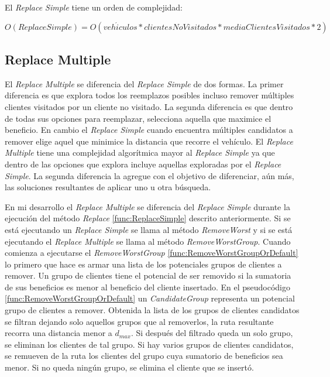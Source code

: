 \begin{minipage}{\linewidth}
El \textit{Replace Simple} tiene un orden de complejidad:

\begin{equation*}
O(Replace Simple) = O(veh\acute{i}culos * clientesNoVisitados * mediaClientesVisitados * 2)
\end{equation*}
\end{minipage}

\bigskip

\subsection{Replace Multiple}

El \textit{Replace Multiple} se diferencia del \textit{Replace Simple} de dos formas. La primer diferencia es que explora todos los reemplazos posibles incluso remover múltiples clientes visitados por un cliente no visitado. La segunda diferencia es que dentro de todas sus opciones para reemplazar, selecciona aquella que maximice el beneficio. En cambio el \textit{Replace Simple} cuando encuentra múltiples candidatos a remover elige aquel que minimice la distancia que recorre el vehículo. El \textit{Replace Multiple} tiene una complejidad algorítmica mayor al \textit{Replace Simple} ya que dentro de las opciones que explora incluye aquellas exploradas por el \textit{Replace Simple}. La segunda diferencia la agregue con el objetivo de diferenciar, aún más, las soluciones resultantes de aplicar uno u otra búsqueda.

\bigskip

En mi desarrollo el \textit{Replace Multiple} se diferencia del \textit{Replace Simple} durante la ejecución del método \textit{Replace} \ref{func:ReplaceSimple} descrito anteriormente. Si se está ejecutando un \textit{Replace Simple} se llama al método \textit{RemoveWorst} y si se está ejecutando el \textit{Replace Multiple} se llama al método \textit{RemoveWorstGroup}. Cuando comienza a ejecutarse el \textit{RemoveWorstGroup} \ref{func:RemoveWorstGroupOrDefault} lo primero que hace es armar una lista de los potenciales grupos de clientes a remover. Un grupo de clientes tiene el potencial de ser removido si la sumatoria de sus beneficios es menor al beneficio del cliente insertado. En el pseudocódigo \ref{func:RemoveWorstGroupOrDefault} un \textit{CandidateGroup} representa un potencial grupo de clientes a remover. Obtenida la lista de los grupos de clientes candidatos se filtran dejando solo aquellos grupos que al removerlos, la ruta resultante recorra una distancia menor a $d_{max}$. Si después del filtrado queda un solo grupo, se eliminan los clientes de tal grupo. Si hay varios grupos de clientes candidatos, se remueven de la ruta los clientes del grupo cuya sumatorio de beneficios sea menor. Si no queda ningún grupo, se elimina el cliente que se insertó.

